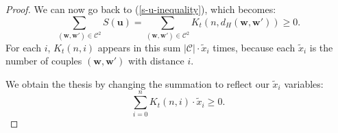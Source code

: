 \begin{lemma}
\begin{proof}
        We can now go back to (\ref{s-u-inequality}), which becomes:
        \begin{equation}
            \sum_{(\mathbf{w}, \mathbf{w}')\in\mathcal{C}^2}S(\mathbf{u}) = \sum_{(\mathbf{w}, \mathbf{w}')\in\mathcal{C}^2}K_t(n,d_H(\mathbf{w}, \mathbf{w}')) \geq 0.
        \end{equation}
        For each $i$, $K_t(n,i)$ appears in this sum $|\mathcal{C}|\cdot \tilde{x}_i$ times, because each $\tilde{x}_i$ is the number of couples $(\mathbf{w}, \mathbf{w}')$ with distance $i$. 

        We obtain the thesis by changing the summation to reflect our $\tilde{x}_i$ variables:
        \begin{equation}
            \sum_{i=0}^{n}K_t(n,i)\cdot\tilde{x}_i \geq 0.
        \end{equation}
    \end{proof}
\end{lemma}
